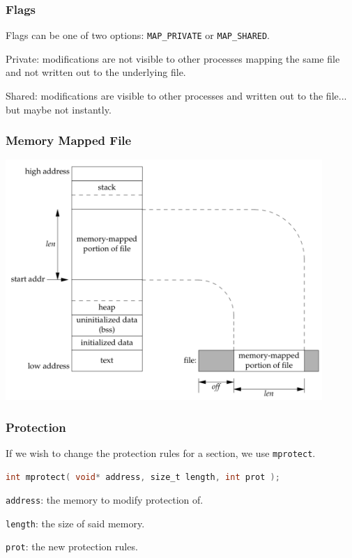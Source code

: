 \begin{frame}
	\frametitle{Flags}
	Flags can be one of two options: \texttt{MAP\_PRIVATE} or \texttt{MAP\_SHARED}.

	Private: modifications are not visible to other processes mapping the same file and not written out to the underlying file.

	Shared: modifications are visible to other processes and written out to the file... but maybe not instantly.

\end{frame}


\begin{frame}
	\frametitle{Memory Mapped File}

	\begin{center}
		\includegraphics[width=0.9\textwidth]{images/memory-mapped-file.png}
	\end{center}

\end{frame}


\begin{frame}[fragile]
	\frametitle{Protection}

	If we wish to change the protection rules for a section, we use \texttt{mprotect}.

	\begin{lstlisting}[language=C]
int mprotect( void* address, size_t length, int prot );
\end{lstlisting}

	\texttt{address}: the memory to modify protection of.

	\texttt{length}: the size of said memory.

	\texttt{prot}: the new protection rules.

\end{frame}


